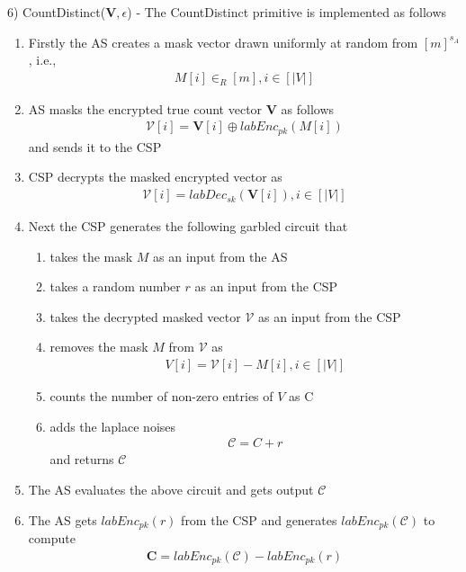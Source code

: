6) \textsf{CountDistinct}($\mathbf{V},\epsilon$) - The \textsf{CountDistinct} primitive is implemented as follows \begin{enumerate}[label=\alph*)]\item Firstly the \textsf{AS} creates a mask vector drawn uniformly at random from $[m]^{s_A}$, i.e.,  \begin{gather*} M[i] \in_R [m], i \in [|V|]\end{gather*} \item \textsf{AS} masks the encrypted true count vector $\mathbf{V}$  as follows \begin{gather*}\boldsymbol{\mathcal{V}}[i]= \mathbf{V}[i] \oplus labEnc_{pk}(M[i])\end{gather*} and sends it to the \textsf{CSP} \item \textsf{CSP} decrypts the masked encrypted vector as \begin{gather*}\mathcal{V}[i]=labDec_{sk}(\mathbf{V}[i]), i \in [|V|]\end{gather*} \item Next the \textsf{CSP} generates the following garbled circuit that\begin{enumerate}[label=\roman*)]  \item takes the mask $M$ as an input from the \textsf{AS} \item takes a random number $r$  as an input from the \textsf{CSP}\item takes the decrypted masked vector $\mathcal{V}$ as an input from the \textsf{CSP} \item removes the mask $M$ from $\mathcal{V}$ as \begin{gather*}V[i]=\mathcal{V}[i]-M[i], i \in [|V|]\end{gather*}\item  counts the number of non-zero entries of $V$ as C \item adds the laplace noises \begin{gather*}\mathcal{C}=C+r\end{gather*} and returns $\mathcal{C}$ \end{enumerate} \item The \textsf{AS} evaluates the above circuit and gets output $\mathcal{C}$ \item The \textsf{AS} gets $labEnc_{pk}(r)$ from the \textsf{CSP} and generates $labEnc_{pk}(\mathcal{C})$ to compute\begin{gather*}\mathbf{C}=labEnc_{pk}(\mathcal{C})-labEnc_{pk}(r)\end{gather*} \end{enumerate} 

